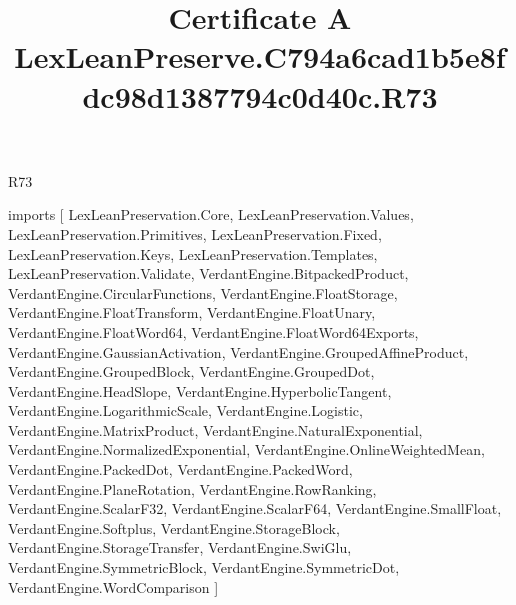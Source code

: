 \begin{lexlean}{R73}
\title{Certificate A LexLeanPreserve.C794a6cad1b5e8fdc98d1387794c0d40c.R73}
\begin{coremodule}
imports [
  LexLeanPreservation.Core,
  LexLeanPreservation.Values,
  LexLeanPreservation.Primitives,
  LexLeanPreservation.Fixed,
  LexLeanPreservation.Keys,
  LexLeanPreservation.Templates,
  LexLeanPreservation.Validate,
  VerdantEngine.BitpackedProduct,
  VerdantEngine.CircularFunctions,
  VerdantEngine.FloatStorage,
  VerdantEngine.FloatTransform,
  VerdantEngine.FloatUnary,
  VerdantEngine.FloatWord64,
  VerdantEngine.FloatWord64Exports,
  VerdantEngine.GaussianActivation,
  VerdantEngine.GroupedAffineProduct,
  VerdantEngine.GroupedBlock,
  VerdantEngine.GroupedDot,
  VerdantEngine.HeadSlope,
  VerdantEngine.HyperbolicTangent,
  VerdantEngine.LogarithmicScale,
  VerdantEngine.Logistic,
  VerdantEngine.MatrixProduct,
  VerdantEngine.NaturalExponential,
  VerdantEngine.NormalizedExponential,
  VerdantEngine.OnlineWeightedMean,
  VerdantEngine.PackedDot,
  VerdantEngine.PackedWord,
  VerdantEngine.PlaneRotation,
  VerdantEngine.RowRanking,
  VerdantEngine.ScalarF32,
  VerdantEngine.ScalarF64,
  VerdantEngine.SmallFloat,
  VerdantEngine.Softplus,
  VerdantEngine.StorageBlock,
  VerdantEngine.StorageTransfer,
  VerdantEngine.SwiGlu,
  VerdantEngine.SymmetricBlock,
  VerdantEngine.SymmetricDot,
  VerdantEngine.WordComparison
]


\end{coremodule}
\end{lexlean}
